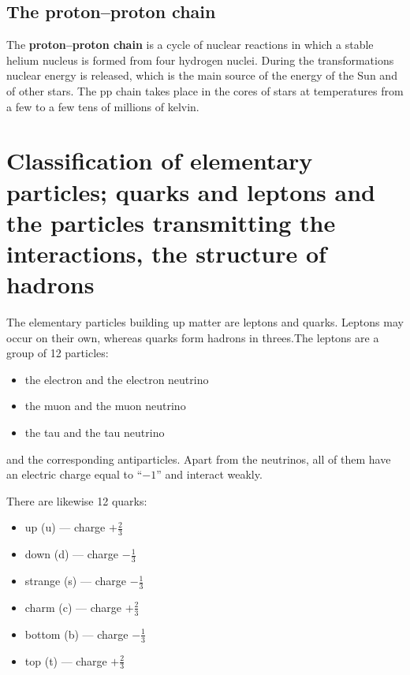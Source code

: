 \subsection{The proton--proton chain}

The \textbf{proton--proton chain} is a cycle of nuclear reactions in which a stable helium nucleus is formed from four hydrogen nuclei. During the transformations nuclear energy is released, which is the main source of the energy of the Sun and of other stars. The pp chain takes place in the cores of stars at temperatures from a few to a few tens of millions of kelvin.

\section{Classification of elementary particles; quarks and leptons and the particles transmitting the interactions, the structure of hadrons}

The elementary particles building up matter are leptons and quarks. Leptons may occur on their own, whereas quarks form hadrons in threes.\merr The leptons are a group of 12 particles:

\begin{itemize}
    \item the electron and the electron neutrino
    \item the muon and the muon neutrino
    \item the tau and the tau neutrino
\end{itemize}

and the corresponding antiparticles. Apart from the neutrinos, all of them have an electric charge equal to ``$-1$'' and interact weakly.\merr

There are likewise 12 quarks:

\begin{itemize}
    \item up (u) --- charge $+\frac{2}{3}$
    \item down (d) --- charge $-\frac{1}{3}$
    \item strange (s) --- charge $-\frac{1}{3}$
    \item charm (c) --- charge $+\frac{2}{3}$
    \item bottom (b) --- charge $-\frac{1}{3}$
    \item top (t) --- charge $+\frac{2}{3}$
\end{itemize}

